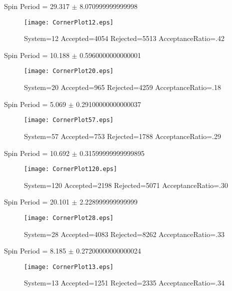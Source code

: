 \documentclass[10pt]{article}
\begin{document}
\newpage
\begin{center}
        Spin Period = 29.317 $\pm$ 8.070999999999998
        \end{center}
\begin{figure}[H] 
        \texttt{[image: CornerPlot12.eps]}
        \caption{System=12 Accepted=4054 Rejected=5513 AcceptanceRatio=.42}
        \label{S12}
        \centering
        \end{figure}
\newpage
\begin{center}
        Spin Period = 10.188 $\pm$ 0.5960000000000001
        \end{center}
\begin{figure}[H] 
        \texttt{[image: CornerPlot20.eps]}
        \caption{System=20 Accepted=965 Rejected=4259 AcceptanceRatio=.18}
        \label{S20}
        \centering
        \end{figure}
\newpage
\begin{center}
        Spin Period = 5.069 $\pm$ 0.29100000000000037
        \end{center}
\begin{figure}[H] 
        \texttt{[image: CornerPlot57.eps]}
        \caption{System=57 Accepted=753 Rejected=1788 AcceptanceRatio=.29}
        \label{S57}
        \centering
        \end{figure}
\newpage
\begin{center}
        Spin Period = 10.692 $\pm$ 0.31599999999999895
        \end{center}
\begin{figure}[H] 
        \texttt{[image: CornerPlot120.eps]}
        \caption{System=120 Accepted=2198 Rejected=5071 AcceptanceRatio=.30}
        \label{S120}
        \centering
        \end{figure}
\newpage
\begin{center}
        Spin Period = 20.101 $\pm$ 2.228999999999999
        \end{center}
\begin{figure}[H] 
        \texttt{[image: CornerPlot28.eps]}
        \caption{System=28 Accepted=4083 Rejected=8262 AcceptanceRatio=.33}
        \label{S28}
        \centering
        \end{figure}
\newpage
\begin{center}
        Spin Period = 8.185 $\pm$ 0.27200000000000024
        \end{center}
\begin{figure}[H] 
        \texttt{[image: CornerPlot13.eps]}
        \caption{System=13 Accepted=1251 Rejected=2335 AcceptanceRatio=.34}
        \label{S13}
        \centering
        \end{figure}
\end{document}
